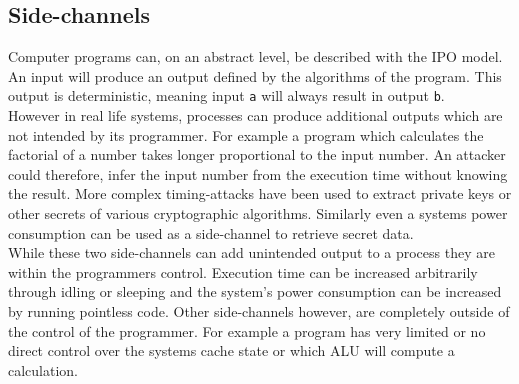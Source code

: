 \documentclass[conference,compsoc,final,a4paper]{IEEEtran}
\begin{document}
\subsection{Side-channels}
Computer programs can, on an abstract level, be described with the \ac{IPO} model. An input will produce an output defined by the algorithms
of the program. This output is deterministic, meaning input \lstinline|a| will always result in output \lstinline|b|. \\
However in real life systems, processes can produce additional outputs which are not intended by its programmer. For example a program which calculates the
factorial of a number takes longer proportional to the input number. An attacker could therefore, infer the input number from the execution time without knowing the
result. More complex timing-attacks have been used to extract private keys or other secrets
of various cryptographic algorithms. \cite{bernstein2005cache}\cite{kocher1996timing}
Similarly even a systems power consumption can be used as a side-channel to retrieve secret data. \cite{kocher1999differential} \\
While these two side-channels can add unintended output to a process they are within the programmers control. Execution time can be increased arbitrarily through
idling or sleeping and the system's power consumption can be increased by running pointless code. Other side-channels however, are completely outside of the
control of the programmer. For example a program has very limited or no direct control over the systems cache state or which \ac{ALU} will compute a calculation. \cite{kocher2018spectre}
\end{document}
